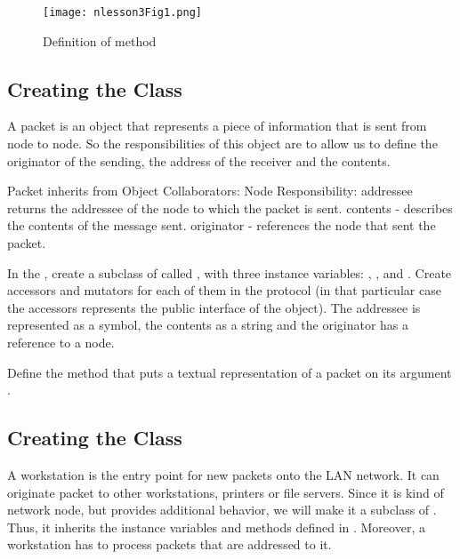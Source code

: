 \begin{figure}[htbp]
\begin{center}
\texttt{[image: nlesson3Fig1.png]}
\caption{Definition of  method}
\end{center}
\end{figure}



\subsection*{Creating the Class }

A packet is an object that represents a piece of information that is sent from node to node. So the responsibilities of this object are to allow us to define the originator of the sending, the address of the receiver and the contents.

\begin{code}
Packet inherits from Object
Collaborators: Node
Responsibility:
addressee returns the addressee of the node to which
the packet is sent.
contents - describes the contents of the message sent.
originator - references the node that sent the packet.
\end{code}

\exercise  In the , create a subclass of 
called , with three instance variables: ,
, and . Create accessors and mutators
for each of them in the  protocol (in that
particular case the accessors represents the public interface of
the object). The addressee is represented as a symbol, the
contents as a string and the originator has a reference to a node.

\exercise  Define the method  that puts a
textual representation of a packet on its argument
.

\subsection*{Creating the Class }

A workstation is the entry point for new packets onto the LAN
network. It can originate packet to other workstations, printers
or file servers. Since it is kind of network node, but provides
additional behavior, we will make it a subclass of .
Thus, it inherits the instance variables and methods defined in
. Moreover, a workstation has to process packets
that are addressed to it.

